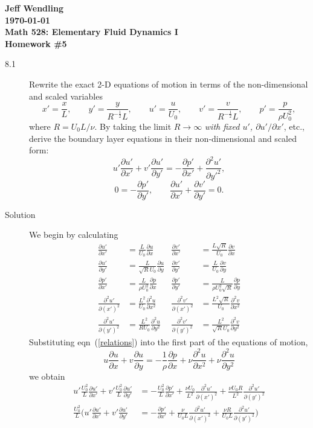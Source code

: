 \documentclass[11pt]{article}
\newcommand{\eq}[1]{\begin{align*}#1\end{align*}}
\newcommand{\eqr}[1]{eqn~(\ref{#1})}
\newcommand{\fp}[2]{\frac{\partial#1}{\partial#2}}
\newcommand{\fpp}[2]{\frac{\partial^2 #1}{\partial#2^2}}
\begin{document}
\begin{center}
{\large\bf 
Jeff Wendling\\
\today\\
Math 528: Elementary Fluid Dynamics I\\
Homework \#5
}
\end{center}
\begin{description}
\item[8.1] Rewrite the exact 2-D equations of motion in terms of the non-dimensional
and scaled variables
$$
  x' = \frac{x}{L},
  \qquad
  y' = \frac{y}{R^{-\frac{1}{2}}L},
  \qquad
  u' = \frac{u}{U_0},
  \qquad
  v' = \frac{v}{R^{-\frac{1}{2}}L},
  \qquad
  p' = \frac{p}{\rho U_0^2},
$$
where $R = U_0L/\nu$. By taking the limit $R \rightarrow \infty$
\emph{with fixed $u'$, $\partial u' / \partial x'$}, etc., derive the boundary
layer equations in their non-dimensional and scaled form:
$$
  u' \fp{u'}{x'} + v'\fp{u'}{y'} = -\fp{p'}{x'} + \fpp{u'}{y'},
$$
$$
  0 = -\fp{p'}{y'},
  \qquad
  \fp{u'}{x'} + \fp{v'}{y'} = 0.
$$
\item[Solution] We begin by calculating
\begin{align}
\label{relations}
\nonumber  \fp{u'}{x'} &= \frac{L}{U_0} \fp{u}{x} &
           \fp{v'}{x'} &= \frac{L\sqrt{R}}{U_0} \fp{v}{x} \\
\nonumber  \fp{u'}{y'} &= \frac{L}{\sqrt{R}U_0} \fp{u}{y} &
           \fp{v'}{y'} &= \frac{L}{U_0} \fp{v}{y} \\
\nonumber  \fp{p'}{x'} &= \frac{L}{\rho U_0^2} \fp{p}{x} &
           \fp{p'}{y'} &= \frac{L}{\rho U_0^2 \sqrt{R}} \fp{p}{y} \\
\nonumber  \fpp{u'}{(x')} &= \frac{L^2}{U_0} \fpp{u}{x} &
           \fpp{v'}{(x')} &= \frac{L^2\sqrt{R}}{U_0} \fpp{v}{x} \\
           \fpp{u'}{(y')} &= \frac{L^2}{RU_0} \fpp{u}{y} &
           \fpp{v'}{(y')} &= \frac{L^2}{\sqrt{R}U_0} \fpp{v}{y}
\end{align}
Substituting \eqr{relations} into the first part of the equations of motion,
$$
  u \fp{u}{x} + v \fp{u}{y} = -\frac{1}{\rho} \fp{p}{x} + \nu \fpp{u}{x} + \nu \fpp{u}{y}
$$
we obtain
\eq{
  u' \frac{U_0^2}{L} \fp{u'}{x'}
  + v' \frac{U_0^2}{L} \fp{u'}{y'}
  &= 
  -\frac{U_0^2}{L} \fp{p'}{x'}
  + \frac{\nu U_0}{L^2} \fpp{u'}{(x')}
  + \frac{\nu U_0 R}{L^2} \fpp{u'}{(y')}
  \\
%
%
  \frac{U_0^2}{L}\bigg(
  u' \fp{u'}{x'}
  + v' \fp{u'}{y'}
  &=
  - \fp{p'}{x'}
  + \frac{\nu}{U_0 L} \fpp{u'}{(x')}
  + \frac{\nu R}{U_0 L} \fpp{u'}{(y')}
  \bigg)
}
\end{description}
\end{document}
